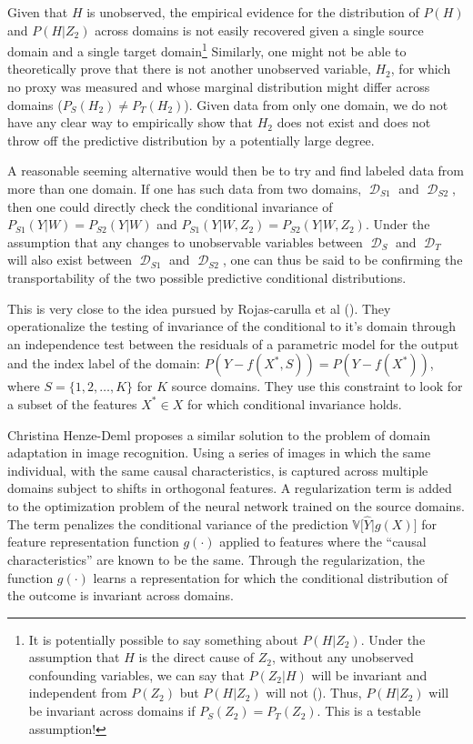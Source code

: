 \documentclass[a4paper,12pt]{article}
\DeclareMathOperator*{\D}{\mathcal{D}}
\begin{document}
Given that $H$ is unobserved, the empirical evidence for the distribution of $P(H)$ and $P(H|Z_2)$ across domains is not easily recovered given a single source domain and a single target domain\footnote{It is potentially possible to say something about $P(H|Z_2)$. Under the assumption that $H$ is the direct cause of $Z_2$, without any unobserved confounding variables, we can say that $P(Z_2|H)$ will be invariant and independent from $P(Z_2)$ but $P(H|Z_2)$ will not (\cite[see][for an exposition of this feature which is closely related to weak exogoneity]{Daniusis2010, Sch2012, Peters2017}). Thus, $P(H|Z_2)$ will be invariant across domains if $P_S(Z_2) = P_T(Z_2)$. This is a testable assumption! } Similarly, one might not be able to theoretically prove that there is not another unobserved variable, $H_2$, for which no proxy was measured and whose marginal distribution might differ across domains ($P_S(H_2) \neq P_T(H_2)$). Given data from only one domain, we do not have any clear way to empirically show that $H_2$ does not exist and does not throw off the predictive distribution by a potentially large degree. 

A reasonable seeming alternative would then be to try and find labeled data from more than one domain. If one has such data from two domains, $\D_{S1}$ and $\D_{S2}$, then one could directly check the conditional invariance of $P_{S1}(Y|W) = P_{S2}(Y|W)$ and $P_{S1}(Y|W,Z_2) = P_{S2}(Y|W,Z_2)$. Under the assumption that any changes to unobservable variables between $\D_S$  and $\D_T$ will also exist between $\D_{S1}$ and $\D_{S2}$, one can thus be said to be confirming the transportability of the two possible predictive conditional distributions. 

This is very close to the idea pursued by Rojas-carulla et al (\cite{Rojas-carulla2018}). They operationalize the testing of invariance of the conditional to it's domain through an independence test between the residuals of a parametric model for the output and the index label of the domain: $P(Y - f(X^*, S)) = P(Y - f(X^*))$, where $S = \{1,2,\ldots,K \}$ for $K$ source domains. They use this constraint to look for a subset of the features $X^* \in X$ for which conditional invariance holds. 

Christina Henze-Deml \parencite*{Heinze-deml2017} proposes a similar solution to the problem of domain adaptation in image recognition. Using a series of images in which the same individual, with the same causal characteristics, is captured across multiple domains subject to shifts in orthogonal features. A regularization term is added to the optimization problem of the neural network trained on the source domains. The term penalizes the conditional variance of the prediction $\mathbb{V}\big[ \hat{Y}| g(X) \big]$ for feature representation function $g(\cdot)$ applied to features where the ``causal characteristics'' are known to be the same. Through the regularization, the function $g(\cdot)$ learns a representation for which the conditional distribution of the outcome is invariant across domains. 
\end{document}
